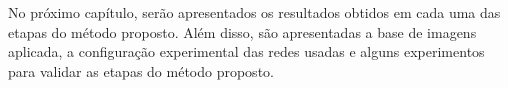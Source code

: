 
No próximo capítulo, serão apresentados os resultados obtidos em cada uma das etapas do método proposto. Além disso, são apresentadas a base de imagens aplicada, a configuração experimental das redes usadas e alguns experimentos para validar as etapas do método proposto.
